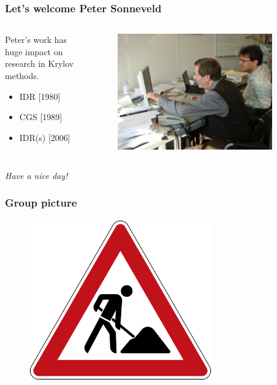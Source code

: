 \documentclass{beamer}
\begin{document}
\begin{frame}
\frametitle{Let's welcome Peter Sonneveld}
 \begin{columns}
 \begin{column}{0.6\textwidth}
 Peter's work has huge impact on research in Krylov methods.
 \begin{itemize}
  \item IDR [1980]
  \item CGS [1989]
  \item IDR(s) [2006]
 \end{itemize}
 \end{column}

 \begin{column}{0.4\textwidth}
  \begin{figure}[t]
  \includegraphics[width=0.9\textwidth]{pics/idr1.jpg}
  \end{figure}
 \end{column}
 \end{columns}
 \vspace{1cm}
 \pause
 \begin{center}
  \textit{Have a nice day!}
 \end{center}
\end{frame}

\begin{frame}
 \frametitle{Group picture}
   \begin{figure}[t]
   \vspace{-0.3cm}
  \includegraphics[width=0.7\textwidth]{pics/baustelle.png}
  \end{figure}
\end{frame}
\end{document}
